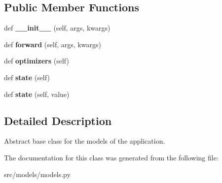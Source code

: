\subsection*{Public Member Functions}
\begin{DoxyCompactItemize}
\item 
def {\bfseries \+\_\+\+\_\+init\+\_\+\+\_\+} (self, args, kwargs)\hypertarget{classmodels_1_1Model_aea39a6bdcd457608191134ad242483d5}{}\label{classmodels_1_1Model_aea39a6bdcd457608191134ad242483d5}

\item 
def {\bfseries forward} (self, args, kwargs)\hypertarget{classmodels_1_1Model_ac728afe3fa0a0e3b9fc0d4e9915eaddb}{}\label{classmodels_1_1Model_ac728afe3fa0a0e3b9fc0d4e9915eaddb}

\item 
def {\bfseries optimizers} (self)\hypertarget{classmodels_1_1Model_a0b91985281f94a1c9b59e2522b740114}{}\label{classmodels_1_1Model_a0b91985281f94a1c9b59e2522b740114}

\item 
def {\bfseries state} (self)\hypertarget{classmodels_1_1Model_af4b179360ee86d580f511993a15afb3c}{}\label{classmodels_1_1Model_af4b179360ee86d580f511993a15afb3c}

\item 
def {\bfseries state} (self, value)\hypertarget{classmodels_1_1Model_a93fe7762f4751f827e8101ee42b33172}{}\label{classmodels_1_1Model_a93fe7762f4751f827e8101ee42b33172}

\end{DoxyCompactItemize}


\subsection{Detailed Description}
\begin{DoxyVerb}Abstract base class for the models of the application.
\end{DoxyVerb}
 

The documentation for this class was generated from the following file\+:\begin{DoxyCompactItemize}
\item 
src/models/models.\+py\end{DoxyCompactItemize}
